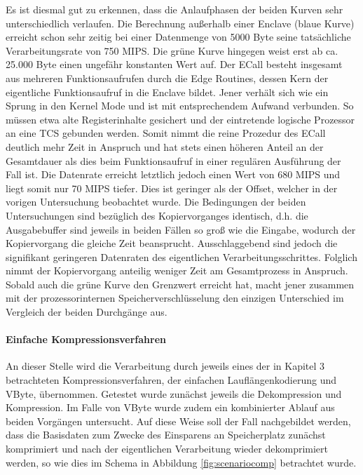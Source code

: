 Es ist diesmal gut zu erkennen, dass die Anlaufphasen der beiden Kurven sehr unterschiedlich verlaufen. Die Berechnung außerhalb einer Enclave (blaue Kurve) erreicht schon sehr zeitig bei einer Datenmenge von 5000 Byte seine tatsächliche Verarbeitungsrate von 750 \ac{MIPS}. Die grüne Kurve hingegen weist erst ab ca. 25.000 Byte einen ungefähr konstanten Wert auf. Der \ac{ECall} besteht insgesamt aus mehreren Funktionsaufrufen durch die Edge Routines, dessen Kern der eigentliche Funktionsaufruf in die Enclave bildet. Jener verhält sich wie ein Sprung in den Kernel Mode und ist mit entsprechendem Aufwand verbunden. So müssen etwa alte Registerinhalte gesichert und der eintretende logische Prozessor an eine \ac{TCS} gebunden werden. Somit nimmt die reine Prozedur des \ac{ECall} deutlich mehr Zeit in Anspruch und hat stets einen höheren Anteil an der Gesamtdauer als dies beim Funktionsaufruf in einer regulären Ausführung der Fall ist. Die Datenrate erreicht letztlich jedoch einen Wert von 680 \ac{MIPS} und liegt somit nur 70 \ac{MIPS} tiefer. Dies ist geringer als der Offset, welcher in der vorigen Untersuchung beobachtet wurde. Die Bedingungen der beiden Untersuchungen sind bezüglich des Kopiervorganges identisch, d.h. die Ausgabebuffer sind jeweils in beiden Fällen so groß wie die Eingabe, wodurch der Kopiervorgang die gleiche Zeit beansprucht. Ausschlaggebend sind jedoch die signifikant geringeren Datenraten des eigentlichen Verarbeitungsschrittes. Folglich nimmt der Kopiervorgang anteilig weniger Zeit am Gesamtprozess in Anspruch. Sobald auch die grüne Kurve den Grenzwert erreicht hat, macht jener zusammen mit der prozessorinternen Speicherverschlüsselung den einzigen Unterschied im Vergleich der beiden Durchgänge aus.

\paragraph{Einfache Kompressionsverfahren}

An dieser Stelle wird die Verarbeitung durch jeweils eines der in Kapitel 3 betrachteten Kompressionsverfahren, der einfachen Lauflängenkodierung und VByte, übernommen. Getestet wurde zunächst jeweils die Dekompression und Kompression. Im Falle von VByte wurde zudem ein kombinierter Ablauf aus beiden Vorgängen untersucht. Auf diese Weise soll der Fall nachgebildet werden, dass die Basisdaten zum Zwecke des Einsparens an Speicherplatz zunächst komprimiert und nach der eigentlichen Verarbeitung wieder dekomprimiert werden, so wie dies im Schema in Abbildung \ref{fig:scenariocomp} betrachtet wurde.

